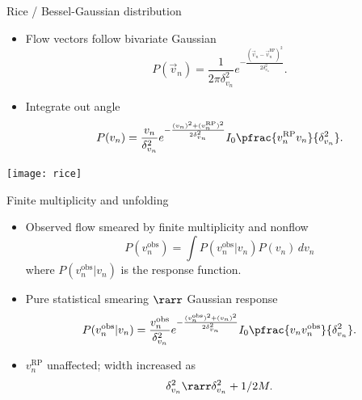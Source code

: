 \documentclass{beamer}
\begin{document}
\begin{frame}[label=rice]{Rice / Bessel-Gaussian distribution}
  \vspace{1em}

  \begin{itemize}
    \item Flow vectors follow bivariate Gaussian
      \begin{equation*}
        P(\vec v_n) = \frac{1}{2\pi\delta_{v_n}^2} e^{ -\frac{(\vec v_n - \vec v_n^\text{RP})^2}{2\delta_{v_n}^2} }.
      \end{equation*}
    \item Integrate out angle
      \begin{equation*}
        P(v_n) = \frac{v_n}{\delta_{v_n}^2} e^{ -\frac{(v_n)^2 + (v_n^\text{RP})^2}{2\delta_{v_n}^2} }
          I_0 \pfrac{v_n^\text{RP}v_n}{\delta_{v_n}^2}.
      \end{equation*}
  \end{itemize}

  \vspace{1em}

  \centering
  \texttt{[image: rice]}
  
\end{frame}


\begin{frame}[label=unfold]{Finite multiplicity and unfolding}
  \def\obs{^\text{obs}}

  \begin{itemize}
    \item Observed flow smeared by finite multiplicity and nonflow
      \begin{equation*}
        P(v_n\obs) = \int P(v_n\obs|v_n) P(v_n) \, dv_n
      \end{equation*}
      where $P(v_n\obs|v_n)$ is the response function.
    \item Pure statistical smearing $\rarr$ Gaussian response
      \begin{equation*}
        P(v_n^\text{obs}|v_n) = \frac{v_n^\text{obs}}{\delta_{v_n}^2} e^{ -\frac{(v_n^\text{obs})^2 + (v_n)^2}{2\delta_{v_n}^2} }
          I_0 \pfrac{v_nv_n^\text{obs}}{\delta_{v_n}^2}.
      \end{equation*}
    \item $v_n^\text{RP}$ unaffected; width increased as
      \begin{equation*}
        \delta_{v_n}^2 \rarr \delta_{v_n}^2 + 1/2M.
      \end{equation*}
  \end{itemize}

\end{frame}
\end{document}

